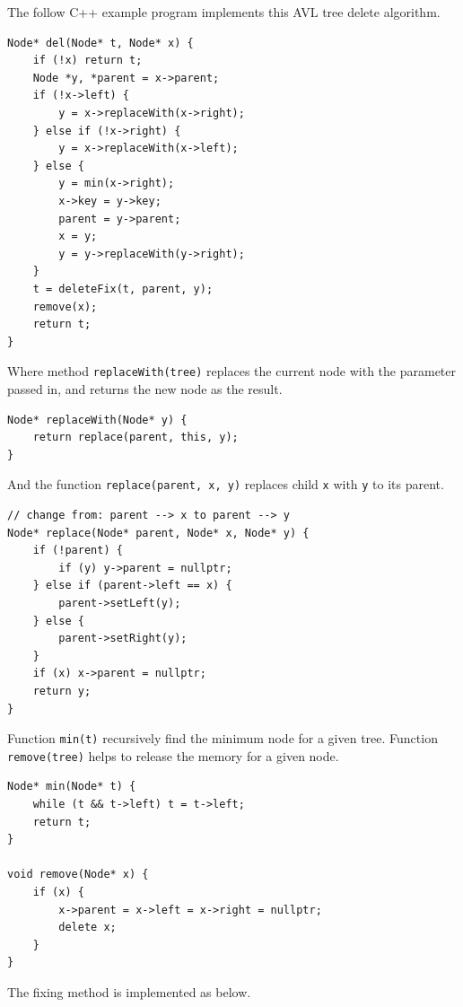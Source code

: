 \documentclass[b5paper]{article}
\begin{document}
The follow C++ example program implements this AVL tree delete algorithm.

\lstset{language=C++}
\begin{lstlisting}
Node* del(Node* t, Node* x) {
    if (!x) return t;
    Node *y, *parent = x->parent;
    if (!x->left) {
        y = x->replaceWith(x->right);
    } else if (!x->right) {
        y = x->replaceWith(x->left);
    } else {
        y = min(x->right);
        x->key = y->key;
        parent = y->parent;
        x = y;
        y = y->replaceWith(y->right);
    }
    t = deleteFix(t, parent, y);
    remove(x);
    return t;
}
\end{lstlisting}

Where method \texttt{replaceWith(tree)} replaces the current node with the parameter
passed in, and returns the new node as the result.

\begin{lstlisting}
Node* replaceWith(Node* y) {
    return replace(parent, this, y);
}
\end{lstlisting}

And the function \texttt{replace(parent, x, y)} replaces child \texttt{x} with \texttt{y} to its parent.

\begin{lstlisting}
// change from: parent --> x to parent --> y
Node* replace(Node* parent, Node* x, Node* y) {
    if (!parent) {
        if (y) y->parent = nullptr;
    } else if (parent->left == x) {
        parent->setLeft(y);
    } else {
        parent->setRight(y);
    }
    if (x) x->parent = nullptr;
    return y;
}
\end{lstlisting}

Function \texttt{min(t)} recursively find the minimum node for a given tree. Function \texttt{remove(tree)} helps to release the memory for a given node.

\begin{lstlisting}
Node* min(Node* t) {
    while (t && t->left) t = t->left;
    return t;
}

void remove(Node* x) {
    if (x) {
        x->parent = x->left = x->right = nullptr;
        delete x;
    }
}
\end{lstlisting}

The fixing method is implemented as below.
\end{document}
